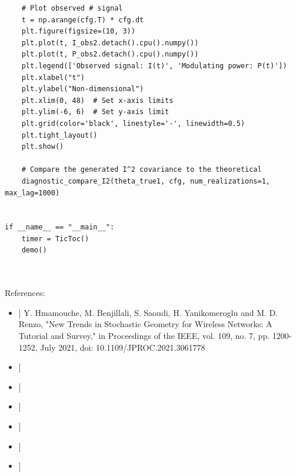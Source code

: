 \documentclass{article}
\begin{document}
\begin{verbatim}
    # Plot observed # signal
    t = np.arange(cfg.T) * cfg.dt
    plt.figure(figsize=(10, 3))
    plt.plot(t, I_obs2.detach().cpu().numpy())
    plt.plot(t, P_obs2.detach().cpu().numpy())
    plt.legend(['Observed signal: I(t)', 'Modulating power: P(t)'])
    plt.xlabel("t")
    plt.ylabel("Non-dimensional")
    plt.xlim(0, 48)  # Set x-axis limits
    plt.ylim(-6, 6)  # Set y-axis limit
    plt.grid(color='black', linestyle='-', linewidth=0.5)
    plt.tight_layout()
    plt.show()

    # Compare the generated I^2 covariance to the theoretical
    diagnostic_compare_I2(theta_true1, cfg, num_realizations=1, max_lag=1000)


if __name__ == "__main__":
    timer = TicToc()
    demo()

    

\end{verbatim}

References:
\begin{itemize}
\item[[1]] Y. Hmamouche, M. Benjillali, S. Saoudi, H. Yanikomeroglu and M. D. Renzo, "New Trends in Stochastic Geometry for Wireless Networks: A Tutorial and Survey," in Proceedings of the IEEE, vol. 109, no. 7, pp. 1200-1252, July 2021, doi: 10.1109/JPROC.2021.3061778 
\item[[2]] 
\item[[3]] 
\item[[4]] 
\item[[5]] 
\item[[6]] 
\item[[7]] 

  
\end{itemize}
\end{document}
